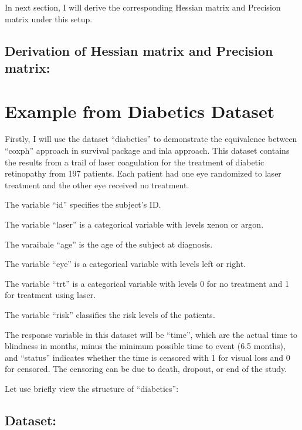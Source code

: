 \documentclass[]{article}
\begin{document}
In next section, I will derive the corresponding Hessian matrix and
Precision matrix under this setup.

\hypertarget{derivation-of-hessian-matrix-and-precision-matrix}{%
\subsection{Derivation of Hessian matrix and Precision
matrix:}\label{derivation-of-hessian-matrix-and-precision-matrix}}

\hypertarget{example-from-diabetics-dataset}{%
\section{Example from Diabetics
Dataset}\label{example-from-diabetics-dataset}}

Firstly, I will use the dataset ``diabetics'' to demonstrate the
equivalence between ``coxph'' approach in survival package and inla
approach. This dataset contains the results from a trail of laser
coagulation for the treatment of diabetic retinopathy from 197 patients.
Each patient had one eye randomized to laser treatment and the other eye
received no treatment.

The variable ``id'' specifies the subject's ID.

The variable ``laser'' is a categorical variable with levels xenon or
argon.

The varaibale ``age'' is the age of the subject at diagnosis.

The variable ``eye'' is a categorical variable with levels left or
right.

The variable ``trt'' is a categorical variable with levels 0 for no
treatment and 1 for treatment using laser.

The variable ``risk'' classifies the risk levels of the patients.

The response variable in this dataset will be ``time'', which are the
actual time to blindness in months, minus the minimum possible time to
event (6.5 months), and ``status'' indicates whether the time is
censored with 1 for visual loss and 0 for censored. The censoring can be
due to death, dropout, or end of the study.

Let use briefly view the structure of ``diabetics'':

\hypertarget{dataset}{%
\subsection{Dataset:}\label{dataset}}
\end{document}
